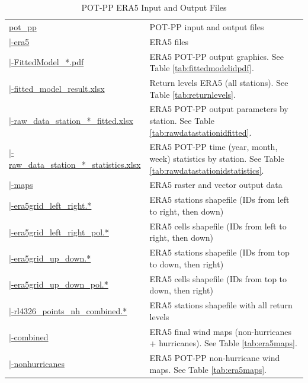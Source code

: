 \documentclass[12pt,twoside]{reedthesis}
\begin{document}
\begin{longtable}[t]{>{\raggedright\arraybackslash}p{2.2in}>{\raggedright\arraybackslash}p{4in}}
\caption[POT-PP ERA5 Input and Output Files]{\label{tab:resultsstructureera5}POT-PP ERA5 Input and Output Files}\\
\toprule
\multicolumn{1}{l}{Folder Tree - Ftp Links} & \multicolumn{1}{l}{Description}\\
\midrule
\href{ftp://ftp.geocorp.co/windthesis/potpp/}{pot\_pp} & POT-PP input and output files\\
\href{ftp://ftp.geocorp.co/windthesis/potpp/era5/}{\;\;|-era5} & ERA5 files\\
\href{ftp://ftp.geocorp.co/windthesis/potpp/era5/}{\;\;\;\;|-FittedModel\_*.pdf} & ERA5 POT-PP output graphics. See Table \ref{tab:fittedmodelidpdf}.\\
\href{ftp://ftp.geocorp.co/windthesis/potpp/era5/fitted_model_result_PoissonProcessGumbelIntFunc.xlsx}{\;\;\;\;|-fitted\_model\_result.xlsx} & Return levels ERA5 (all stations). See Table \ref{tab:returnlevels}.\\
\href{ftp://ftp.geocorp.co/windthesis/potpp/era5/}{\;\;\;\;|-raw\_data\_station\_*\_fitted.xlsx} & ERA5 POT-PP output parameters by station. See Table \ref{tab:rawdatastationidfitted}.\\
\href{ftp://ftp.geocorp.co/windthesis/potpp/era5/}{\;\;\;\;|-raw\_data\_station\_*\_statistics.xlsx} & ERA5 POT-PP time (year, month, week) statistics by station. See Table \ref{tab:rawdatastationidstatistics}.\\
\href{ftp://ftp.geocorp.co/windthesis/potpp/era5/maps/}{\;\;\;\;|-maps} & ERA5 raster and vector output data\\
\href{ftp://ftp.geocorp.co/windthesis/potpp/era5/maps/}{\;\;\;\;\;\;|-era5grid\_left\_right.*} & ERA5 stations shapefile (IDs from left to right, then down)\\
\href{ftp://ftp.geocorp.co/windthesis/potpp/era5/maps/}{\;\;\;\;\;\;|-era5grid\_left\_right\_pol.*} & ERA5 cells shapefile (IDs from left to right, then down)\\
\href{ftp://ftp.geocorp.co/windthesis/potpp/era5/maps/}{\;\;\;\;\;\;|-era5grid\_up\_down.*} & ERA5 stations shapefile (IDs from top to down, then right)\\
\href{ftp://ftp.geocorp.co/windthesis/potpp/era5/maps/}{\;\;\;\;\;\;|-era5grid\_up\_down\_pol.*} & ERA5 cells shapefile (IDs from top to down, then right)\\
\href{ftp://ftp.geocorp.co/windthesis/potpp/era5/maps/}{\;\;\;\;\;\;|-rl4326\_points\_nh\_combined.*} & ERA5 stations shapefile with all return levels\\
\href{ftp://ftp.geocorp.co/windthesis/potpp/era5/maps/combined/}{\;\;\;\;\;\;|-combined} & ERA5 final wind maps (non-hurricanes + hurricanes). See Table \ref{tab:era5maps}.\\
\href{ftp://ftp.geocorp.co/windthesis/potpp/era5/maps/nonhurricanes/}{\;\;\;\;\;\;|-nonhurricanes} & ERA5 POT-PP non-hurricane wind maps. See Table \ref{tab:era5maps}.\\
\bottomrule
\end{longtable}
\endgroup{}
\end{document}
